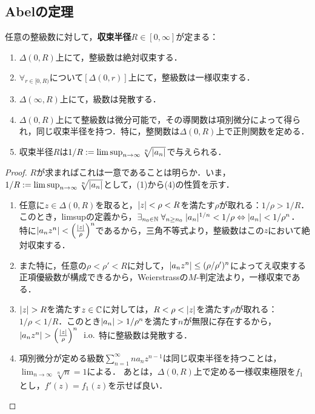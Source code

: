 \documentclass[uplatex, dvipdfmx]{jsreport}
\begin{document}
\subsection{Abelの定理}

\begin{theorem}[Abel]
    任意の整級数に対して，\textbf{収束半径}$R\in[0,\infty]$が定まる：
    \begin{enumerate}
        \item $\Delta(0,R)$上にて，整級数は絶対収束する．
        \item $\forall_{r\in[0,R)}$について$[\Delta(0,r)]$上にて，整級数は一様収束する．
        \item $\Delta(\infty,R)$上にて，級数は発散する．
        \item $\Delta(0,R)$上にて整級数は微分可能で，その導関数は項別微分によって得られ，同じ収束半径を持つ．特に，整関数は$\Delta(0,R)$上で正則関数を定める．
        \item 収束半径$R$は$1/R:=\limsup_{n\to\infty}\sqrt[n]{\lvert a_n\rvert}$で与えられる．
    \end{enumerate}
\end{theorem}
\begin{proof}
    $R$が求まればこれは一意であることは明らか．いま，$1/R:=\limsup_{n\to\infty}\sqrt[n]{\lvert a_n\rvert}$として，(1)から(4)の性質を示す．
    \begin{enumerate}
        \item 任意に$z\in\Delta(0,R)$を取ると，$\lvert z\rvert<\rho<R$を満たす$\rho$が取れる：$1/\rho>1/R$．
        このとき，limsupの定義から，$\exists_{n_0\in\mathbb{N}}\;\forall_{n\ge n_0}\;\lvert a_n\rvert^{1/n}<1/\rho\Leftrightarrow\lvert a_n\rvert<1/\rho^n$．
        特に$\lvert a_nz^n\rvert<\left(\frac{\lvert z\rvert}{\rho}\right)^n$であるから，三角不等式より，整級数はこの$z$において絶対収束する．
        \item また特に，任意の$\rho<\rho'<R$に対して，$\lvert a_nz^n\rvert\le(\rho/\rho')^n$によってえ収束する正項優級数が構成できるから，Weierstrassの$M$-判定法より，一様収束である．
        \item $\lvert z\rvert>R$を満たす$z\in\mathbb{C}$に対しては，$R<\rho<\lvert z\rvert$を満たす$\rho$が取れる：$1/\rho<1/R$．このとき$\lvert a_n\rvert>1/\rho^n$を満たす$n$が無限に存在するから，$\lvert a_nz^n\rvert>\left(\frac{\lvert z\rvert}{\rho}\right)^n\;\;\mathrm{i.o.}$
        特に整級数は発散する．
        \item 項別微分が定める級数$\sum^{\infty}_{n=1}na_nz^{n-1}$は同じ収束半径を持つことは，$\lim_{n\to\infty}\sqrt[n]{n}=1$による．
        あとは，$\Delta(0,R)$上で定める一様収束極限を$f_1$とし，$f'(z)=f_1(z)$を示せば良い．
    \end{enumerate}
\end{proof}
\end{document}
